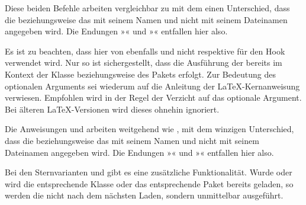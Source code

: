 \begin{Declaration}
\end{Declaration}%
Diese beiden Befehle arbeiten vergleichbar zu
 mit dem einen Unterschied, dass die
 beziehungsweise das  mit seinem Namen und nicht
mit seinem Dateinamen angegeben wird. Die Endungen »« und
»« entfallen hier also.

Es ist zu beachten, dass hier von 
ebenfalls  und nicht  respektive 
für den Hook verwendet wird. Nur so ist sichergestellt, dass die Ausführung
der  bereits im Kontext der Klasse beziehungsweise des
Pakets erfolgt. Zur Bedeutung des optionalen Arguments  sei
wiederum auf die Anleitung der \LaTeX-Kernanweisung
 verwiesen. Empfohlen wird in der Regel
der Verzicht auf das optionale Argument. Bei älteren \LaTeX-Versionen wird
dieses ohnehin ignoriert.%
\EndIndexGroup


\begin{Declaration}
\end{Declaration}%
Die Anweisungen
 und  arbeiten weitgehend wie
, mit dem winzigen Unterschied, dass die
 beziehungsweise das  mit seinem Namen und nicht
mit seinem Dateinamen angegeben wird. Die Endungen »« und
»« entfallen hier also.

Bei den
Sternvarianten  und  gibt es eine
zusätzliche Funktionalität. Wurde oder wird die entsprechende Klasse oder das
entsprechende Paket bereits geladen, so werden die  nicht
nach dem nächsten Laden, sondern unmittelbar ausgeführt.

